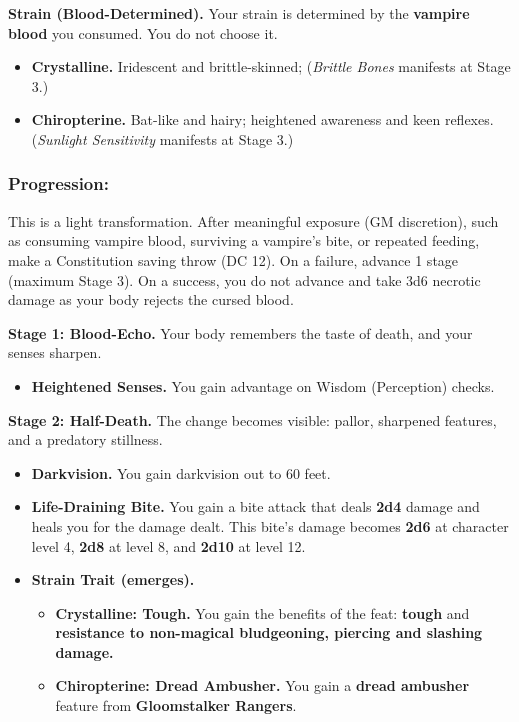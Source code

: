 \documentclass[letterpaper,twocolumn,openany,nodeprecatedcode,breakable,skins,xparse,most]{dndbook}
\begin{document}
\textbf{Strain (Blood-Determined).} Your strain is determined by the \textbf{vampire blood} you consumed. You do not choose it.
\begin{itemize}
\item \textbf{Crystalline.} Iridescent and brittle-skinned; (\emph{Brittle Bones} manifests at Stage 3.)
\item \textbf{Chiropterine.} Bat-like and hairy; heightened awareness and keen reflexes. (\emph{Sunlight Sensitivity} manifests at Stage 3.)
\end{itemize}

\subsubsection{Progression:}
This is a light transformation. After meaningful exposure (GM discretion), such as consuming vampire blood, surviving a vampire's bite, or repeated feeding, make a Constitution saving throw (DC 12). On a failure, advance 1 stage (maximum Stage 3). On a success, you do not advance and take 3d6 necrotic damage as your body rejects the cursed blood.

\medskip

\textbf{Stage 1: Blood-Echo.}
Your body remembers the taste of death, and your senses sharpen.
\begin{itemize}
\item \textbf{Heightened Senses.} You gain advantage on Wisdom (Perception) checks.
\end{itemize}

\textbf{Stage 2: Half-Death.}
The change becomes visible: pallor, sharpened features, and a predatory stillness.
\begin{itemize}
\item \textbf{Darkvision.} You gain darkvision out to 60 feet.
\item \textbf{Life-Draining Bite.} You gain a bite attack that deals \textbf{2d4} damage and heals you for the damage dealt. This bite's damage becomes \textbf{2d6} at character level 4, \textbf{2d8} at level 8, and \textbf{2d10} at level 12.
\item \textbf{Strain Trait (emerges).}
\begin{itemize}
\item \textbf{Crystalline: Tough.} You gain the benefits of the feat: \textbf{tough} and \textbf{resistance to non-magical bludgeoning, piercing and slashing damage.}
\item \textbf{Chiropterine: Dread Ambusher.} You gain a \textbf{dread ambusher} feature from \textbf{Gloomstalker Rangers}.
\end{itemize}
\end{itemize}
\end{document}
